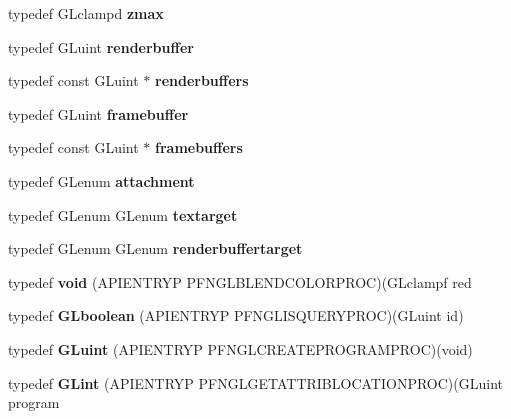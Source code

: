 \begin{DoxyCompactItemize}
\item 
typedef G\+Lclampd {\bfseries zmax}\label{_s_d_l__opengl_8h_af5dc250cf9d7bbba8240af55dff813fe}

\item 
typedef G\+Luint {\bfseries renderbuffer}\label{_s_d_l__opengl_8h_a065ecbf0bfaaefcafcc191ff33481bec}

\item 
typedef const G\+Luint $\ast$ {\bfseries renderbuffers}\label{_s_d_l__opengl_8h_aa17b802a0d8dde64cb30f5d887be5a22}

\item 
typedef G\+Luint {\bfseries framebuffer}\label{_s_d_l__opengl_8h_a9e7d0e14703de01d15e0861b7210b7f8}

\item 
typedef const G\+Luint $\ast$ {\bfseries framebuffers}\label{_s_d_l__opengl_8h_a8e03c10ccdf2060ea88469f578a9cc06}

\item 
typedef G\+Lenum {\bfseries attachment}\label{_s_d_l__opengl_8h_ad8f97111cc6514af5f352219d1cceb40}

\item 
typedef G\+Lenum G\+Lenum {\bfseries textarget}\label{_s_d_l__opengl_8h_aa2b93e62bdaaf32ad646f8df1e87cfdb}

\item 
typedef G\+Lenum G\+Lenum {\bfseries renderbuffertarget}\label{_s_d_l__opengl_8h_ad4ca76f1378b4a8be4243761c8df68e6}

\item 
typedef {\bfseries void} (A\+P\+I\+E\+N\+T\+R\+Y\+P P\+F\+N\+G\+L\+B\+L\+E\+N\+D\+C\+O\+L\+O\+R\+P\+R\+O\+C)(G\+Lclampf red\label{_s_d_l__opengl_8h_a3db05964a3cc4410f35b7ea2b7eb850d}

\item 
typedef {\bfseries G\+Lboolean} (A\+P\+I\+E\+N\+T\+R\+Y\+P P\+F\+N\+G\+L\+I\+S\+Q\+U\+E\+R\+Y\+P\+R\+O\+C)(G\+Luint id)\label{_s_d_l__opengl_8h_a8fe38f5f5d271d25d582135baf95121e}

\item 
typedef {\bfseries G\+Luint} (A\+P\+I\+E\+N\+T\+R\+Y\+P P\+F\+N\+G\+L\+C\+R\+E\+A\+T\+E\+P\+R\+O\+G\+R\+A\+M\+P\+R\+O\+C)(void)\label{_s_d_l__opengl_8h_a2f0c8cd5c21f9fcbd931c3f48bc90dfc}

\item 
typedef {\bfseries G\+Lint} (A\+P\+I\+E\+N\+T\+R\+Y\+P P\+F\+N\+G\+L\+G\+E\+T\+A\+T\+T\+R\+I\+B\+L\+O\+C\+A\+T\+I\+O\+N\+P\+R\+O\+C)(G\+Luint program\label{_s_d_l__opengl_8h_aacf898e4ecb940565baac883dc587ff0}


\end{DoxyCompactItemize}
